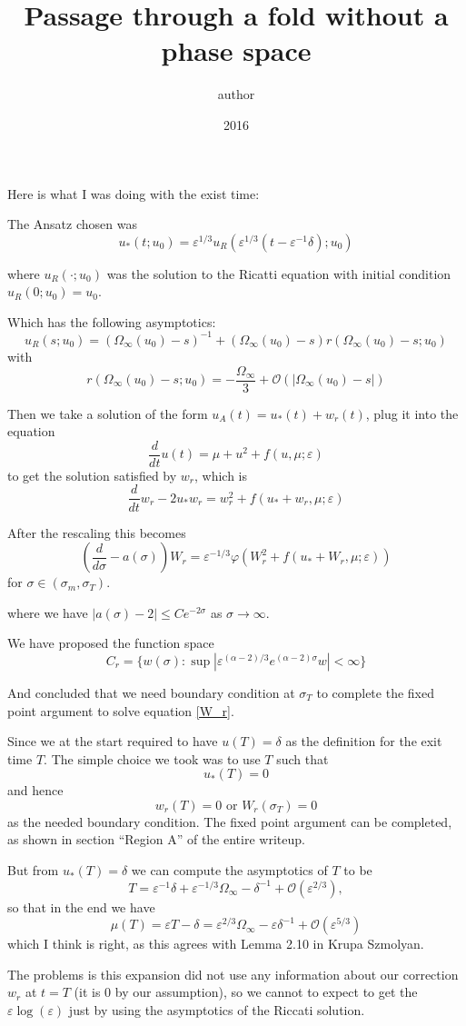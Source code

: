 \documentclass[letterpaper,11pt]{article}
\title{Passage through a fold without a phase space}
\author{author}
\date{2016}
\newcommand{\rmO}{\mathcal{O}}
\newcommand{\eps}{\varepsilon}
\numberwithin{equation}{section}
\theoremstyle{plain}
\begin{document}
Here is what I was doing with the exist time:



The Ansatz chosen was 
\[
u_*(t; u_0)  = \eps^{1/3}u_R(\eps^{1/3}(t-\eps^{-1}\delta); u_0)
\]

where $u_R(\cdot ; u_0)$ was the solution to the Ricatti equation with initial condition $u_R(0; u_0) = u_0$.

Which has the following asymptotics:
\[
u_R( s ; u_0) = (\Omega_\infty(u_0) - s)^{-1} + (\Omega_\infty(u_0) - s) r(\Omega_\infty(u_0) - s; u_0) 
\]
with 
\[
r(\Omega_\infty(u_0) - s; u_0) = -\frac{\Omega_\infty}{3} + \rmO( |\Omega_\infty(u_0) - s |) 
\]

Then we take a solution of the form
$u_A(t) = u_*(t) + w_r(t)$, plug it into the equation
\[
\frac{d}{dt} u(t) = \mu + u^2 + f(u, \mu; \eps)
\]
to get the solution satisfied by $w_r$, which is
\begin{equation}
\frac{d}{dt} w_r -2u_* w_r = w_r^2 + f(u_*+w_r, \mu; \eps)
\end{equation}


After the rescaling this becomes
\begin{equation}\label{W_r}
\left( \frac{d}{d\sigma} - a(\sigma) \right) W_r = \eps^{-1/3} \varphi \left(W_r^2 + f(u_*+W_r, \mu; \eps)\right)
\end{equation}
for $\sigma \in (\sigma_m, \sigma_T)$.

where we have
$|a(\sigma) - 2 | \le Ce^{-2\sigma}$ as $\sigma \to \infty$.

We have proposed the function space
\[
C_r = \{ w(\sigma) : \sup|\eps^{(\alpha-2)/3} e^{(\alpha-2)\sigma} w|<\infty \}
\]

And concluded that we need boundary condition at $\sigma_T$ to complete the fixed point argument to solve equation \eqref{W_r}.



Since we at the start required to have
$u(T) = \delta$ as the definition for the exit time $T$. The simple choice we took was to use $T$ such that
\[
u_*(T) = 0
\]
and hence
\[
w_r(T) = 0 \text{ or }W_r(\sigma_T) = 0
\]
as the needed boundary condition. The fixed point argument can be completed, as shown in section ``Region A'' of the entire writeup. 


But from $u_*(T) = \delta$ we can compute the asymptotics of $T$ to be
\[
T = \eps^{-1}\delta + \eps^{-1/3}\Omega_\infty - \delta^{-1} + \rmO(\eps^{2/3}),
\]
so that in the end we have
\[
\mu(T) = \eps T- \delta = \eps^{2/3}\Omega_\infty -\eps\delta^{-1}+\rmO(\eps^{5/3})
\]
which I think is right, as this agrees with Lemma 2.10 in Krupa Szmolyan.

The problems is this expansion did not use any information about our correction $w_r$ at $t=T$ (it is $0$ by our assumption), so we cannot to expect to get the $\eps\log(\eps)$ just by using the asymptotics of the Riccati solution.
\end{document}
